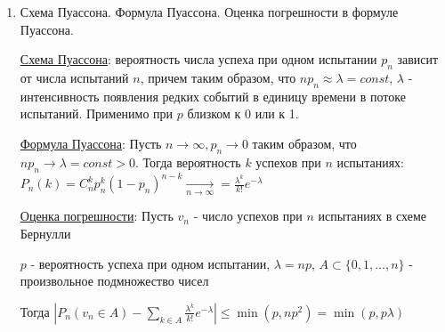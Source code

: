\begin{enumerate}
    \item Схема Пуассона. Формула Пуассона. Оценка погрешности в формуле Пуассона.
    
    \hyperlink{poissonschema}{Схема Пуассона}: вероятность числа успеха при одном испытании $p_n$ зависит от числа испытаний $n$, причем таким образом, что $n p_n \approx \lambda = const$, 
    $\lambda$ - интенсивность появления редких событий в единицу времени в потоке испытаний. Применимо при $p$ близком к 0 или к 1.

    \hyperlink{poissonformula}{Формула Пуассона}: \Ths Пусть $n \to \infty, p_n \to 0$ таким образом, что $n p_n \to \lambda = const > 0$.
    Тогда вероятность $k$ успехов при $n$ испытаниях: $P_n(k) = C^k_n p_n^k (1 - p_n)^{n - k} \underset{n \to \infty}{\rightarrow} = \frac{\lambda^k}{k!} e^{-\lambda}$

    \hyperlink{errorinpoissonformula}{Оценка погрешности}: \Ths Пусть $v_n$ - число успехов при $n$ испытаниях в схеме Бернулли

    $p$ - вероятность успеха при одном испытании, $\lambda = np$, $A \subset \{0, 1, \dots, n\}$ - произвольное подмножество чисел

    Тогда $|P_n (v_n \in A) - \sum_{k \in A} \frac{\lambda^k}{k!} e^{-\lambda}| \leq \min (p, np^2) = \min (p, p\lambda)$


\end{enumerate}
